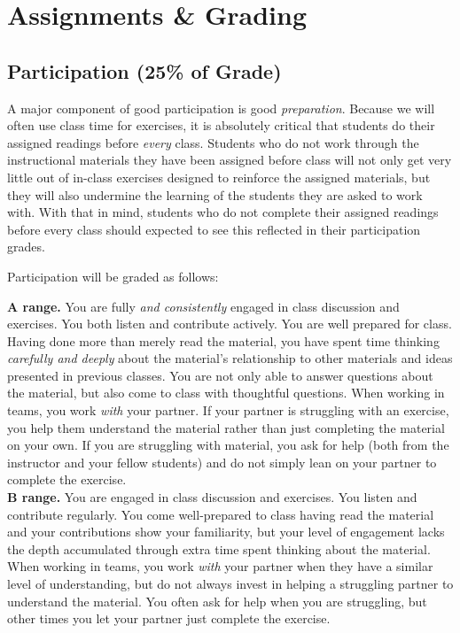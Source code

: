 \documentclass[12pt]{article}
\begin{document}
\section{Assignments \& Grading}

\subsection{Participation (25\% of Grade)}

A major component of good participation is good \emph{preparation}. Because we will often use class time for exercises, it is absolutely critical that students do their assigned readings before \emph{every} class. Students who do not work through the instructional materials they have been assigned before class will not only get very little out of in-class exercises designed to reinforce the assigned materials, but they will also undermine the learning of the students they are asked to work with. With that in mind, students who do not complete their assigned readings before every class should expected to see this reflected in their participation grades.

Participation will be graded as follows:

\textbf{A range.}  You are fully \emph{and consistently} engaged in class discussion and exercises.  You both listen and contribute actively.  You are well prepared for class.  Having done more than merely read the material, you have spent time thinking \emph{carefully and deeply} about the material's relationship to other materials and ideas presented in previous classes. You are not only able to answer questions about the material, but also come to class with thoughtful questions.  When working in teams, you work \emph{with} your partner. If your partner is struggling with an exercise, you help them understand the material rather than just completing the material on your own. If you are struggling with material, you ask for help (both from the instructor and your fellow students) and do not simply lean on your partner to complete the exercise. \\

\textbf{B range.}  You are engaged in class discussion and exercises.  You listen and contribute regularly.  You come well-prepared to class having read the material and your contributions show your familiarity, but your level of engagement lacks the depth accumulated through extra time spent thinking about the material.  When working in teams, you work \emph{with} your partner when they have a similar level of understanding, but do not always invest in helping a struggling partner to understand the material. You often ask for help when you are struggling, but other times you let your partner just complete the exercise. \\
\end{document}
